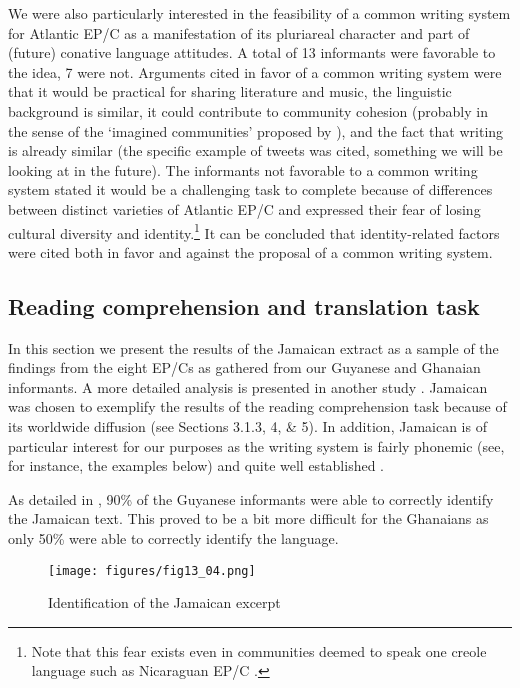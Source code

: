 \documentclass[output=paper,colorlinks,citecolor=brown]{langscibook}
\begin{document}
We were also particularly interested in the feasibility of a common writing system for Atlantic EP/C as a manifestation of its pluriareal character and part of (future) conative language attitudes. A total of 13 informants were favorable to the idea, 7 were not. Arguments cited in favor of a common writing system were that it would be practical for sharing literature and music, the linguistic background is similar, it could contribute to community cohesion (probably in the sense of the `imagined communities' proposed by \cite{Anderson_1983}), and the fact that writing is already similar (the specific example of tweets was cited, something we will be looking at in the future). The informants not favorable to a common writing system stated it would be a challenging task to complete because of differences between distinct varieties of Atlantic EP/C and expressed their fear of losing cultural diversity and identity.\footnote{Note that this fear exists even in communities deemed to speak one creole language such as Nicaraguan EP/C \citep[cf.][]{Freeland_2004}.}  It can be concluded that identity-related factors were cited both in favor and against the proposal of a common writing system.

\subsection{Reading comprehension and translation task}\label{sec:04:3.3}

In this section we present the results of the Jamaican extract as a sample of the findings from the eight EP/Cs as gathered from our Guyanese and Ghanaian informants. A more detailed analysis is presented in another study \citep{Bartens_inpreparation}. Jamaican was chosen to exemplify the results of the reading comprehension task because of its worldwide diffusion (see Sections 3.1.3, 4, \& 5). In addition, Jamaican is of particular interest for our purposes as the writing system is fairly phonemic (see, for instance, the examples below) and quite well established \citep[see][]{Cassidy_LePage_1967}.

As detailed in , 90\% of the Guyanese informants were able to correctly identify the Jamaican text. This proved to be a bit more difficult for the Ghanaians as only 50\% were able to correctly identify the language.

\begin{figure}
    \texttt{[image: figures/fig13\_04.png]}
    \caption{Identification of the Jamaican excerpt}
    \label{fig:fig13_04}
\end{figure}
\end{document}
